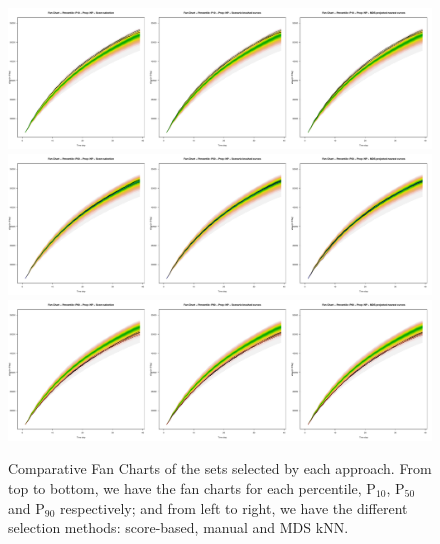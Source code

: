 \documentclass[final,5p,times,twocolumn]{elsarticle}
\begin{document}
\begin{figure}[H]
  \includegraphics[width=\columnwidth]{figures/fanchart-score-brush-mds-p10.pdf}
  \includegraphics[width=\columnwidth]{figures/fanchart-score-brush-mds-p50.pdf}
  \includegraphics[width=\columnwidth]{figures/fanchart-score-brush-mds-p90.pdf}
  \caption{Comparative Fan Charts of the sets selected by each approach. From top to bottom, we have the fan charts for each percentile, P$_{10}$, P$_{50}$ and P$_{90}$ respectively; and from left to right, we have the different selection methods: score-based, manual and MDS kNN.}
  \label{fig:fan-plots}
\end{figure}



\end{document}
